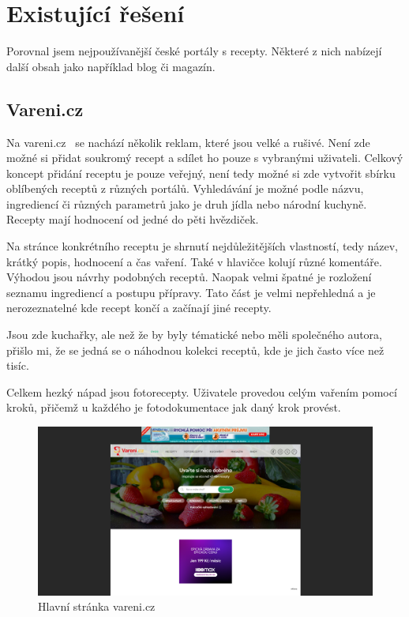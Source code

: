 \section{Existující řešení}

Porovnal jsem nejpoužívanější české portály s recepty. Některé z nich nabízejí další obsah jako například blog či magazín.

\subsection{Vareni.cz}

Na vareni.cz~\cite{VareniCZ} se nachází několik reklam, které jsou velké a rušivé. Není zde možné si přidat soukromý recept a sdílet ho
pouze s vybranými uživateli. Celkový koncept přidání receptu je pouze veřejný, není tedy možné si zde vytvořit sbírku
oblíbených receptů z různých portálů. Vyhledávání je možné podle názvu, ingrediencí či různých parametrů jako je druh jídla
nebo národní kuchyně. Recepty mají hodnocení od jedné do pěti hvězdiček.

Na stránce konkrétního receptu je shrnutí nejdůležitějších vlastností, tedy název, krátký popis, hodnocení a čas vaření.
Také v hlavičce kolují různé komentáře. Výhodou jsou návrhy podobných receptů. Naopak velmi špatné je rozložení seznamu ingrediencí
a postupu přípravy. Tato část je velmi nepřehledná a je nerozeznatelné kde recept končí a začínají jiné recepty.

Jsou zde kuchařky, ale než že by byly tématické nebo měli společného autora, přišlo mi, že se jedná se o náhodnou kolekci receptů,
kde je jich často více než tisíc.

Celkem hezký nápad jsou fotorecepty. Uživatele provedou celým vařením pomocí kroků, přičemž u každého je fotodokumentace jak daný krok
provést.

\begin{figure}[h]
    \includegraphics[width=\textwidth]{images/varenicz-uvodni-stranka}
    \caption{Hlavní stránka vareni.cz} \label{picture:varenicz:uvodni-stranka}
\end{figure}

